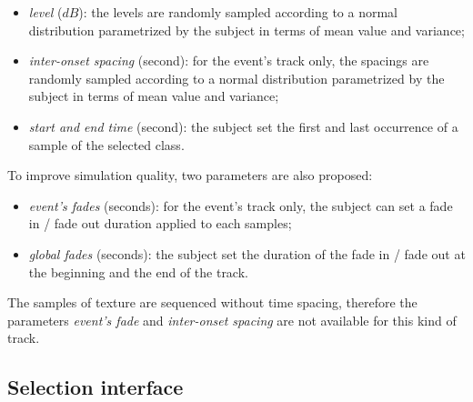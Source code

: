 \documentclass[twoside,twocolumn]{article}
\begin{document}
\begin{itemize}
\item \emph{level} ($dB$): the levels are  randomly sampled according to a normal distribution parametrized by the subject in terms of mean value and variance;
\item \emph{inter-onset spacing} (second): for the event's track only, the spacings are randomly sampled according to a normal distribution parametrized by the subject in terms of mean value and variance;
\item \emph{start and end time} (second): the subject set the first and last occurrence of a sample of the selected class.
\end{itemize}


To improve simulation quality, two parameters are also proposed:


\begin{itemize}
\item \emph{event's fades} (seconds): for the event's track only, the subject can set a fade in / fade out duration applied to each samples;
\item \emph{global fades} (seconds): the subject set the duration of the fade in / fade out at the beginning and the end of the track.
\end{itemize}


The samples of texture are sequenced without time spacing, therefore the parameters \emph{event's fade} and \emph{inter-onset spacing} are not available for this kind of track.

\subsection{Selection interface}
\label{sec:simscene_ssf}
\end{document}
